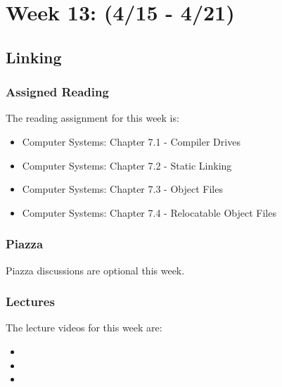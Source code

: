 \clearpage

\renewcommand{\ChapTitle}{Week 13: (4/15 - 4/21)}
\renewcommand{\SectionTitle}{Linking}

\chapter{\ChapTitle}

\section{\SectionTitle}

\subsection{Assigned Reading}

The reading assignment for this week is:

\begin{itemize}
    \item Computer Systems: Chapter 7.1 - Compiler Drives
    \item Computer Systems: Chapter 7.2 - Static Linking
    \item Computer Systems: Chapter 7.3 - Object Files
    \item Computer Systems: Chapter 7.4 - Relocatable Object Files
\end{itemize}

\subsection{Piazza}

Piazza discussions are optional this week. 

\subsection{Lectures}

The lecture videos for this week are:

\begin{itemize}
    \item {}
    \item {}
    \item {}
\end{itemize}

